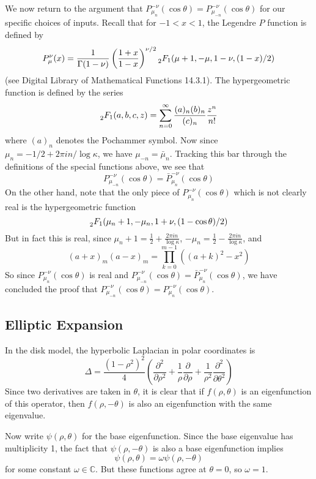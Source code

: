 \documentclass[]{article}
\begin{document}
We now return to the argument that $P_{\mu_{n}}^{-\nu}(\cos\theta) = P_{\mu_{-n}}^{-\nu}(\cos\theta)$ for our specific choices of inputs.
Recall that for $-1 < x < 1$, the Legendre $P$ function is defined by
$$
P_\mu^\nu(x) = 
\frac{1}{\Gamma(1 - \nu)}\left( \frac{1 + x}{1 - x} \right)^{\nu/2}\prescript{}{2}{F_1}(\mu + 1, -\mu, 1 - \nu, (1 - x)/2)
$$
(see Digital Library of Mathematical Functions 14.3.1).
The hypergeometric function is defined by the series
$$
\prescript{}{2}{F_1}(a, b, c, z) = \sum_{n=0}^{\infty}\frac{(a)_n(b)_n}{(c)_n}\frac{z^n}{n!}
$$
where $(a)_n$ denotes the Pochammer symbol.
Now since $\mu_n = -1/2 + 2\pi in/\log\kappa$, we have $\mu_{-n} = \bar{\mu}_n$.
Tracking this bar through the definitions of the special functions above, we see that
$$
P_{\mu_{-n}}^{-\nu}(\cos\theta) = \bar{P}_{\mu_{n}}^{-\nu}(\cos\theta)
$$
On the other hand, note that the only piece of $P_{\mu_{n}}^{-\nu}(\cos\theta)$ which is not clearly real is the hypergeometric function
$$
\prescript{}{2}{F_1}(\mu_n + 1, -\mu_n, 1 + \nu, (1 - \cos\theta)/2)
$$
But in fact this is real, since $\mu_n + 1 = \frac{1}{2} + \frac{2\pi in}{\log\kappa}$, $-\mu_n = \frac{1}{2} - \frac{2\pi in}{\log\kappa}$, and
$$
(a + x)_m(a - x)_m = \prod_{k=0}^{m-1}((a + k)^2 - x^2)
$$
So since $P_{\mu_{n}}^{-\nu}(\cos\theta)$ is real and $P_{\mu_{-n}}^{-\nu}(\cos\theta) = \bar{P}_{\mu_{n}}^{-\nu}(\cos\theta)$, we have concluded the proof that $P_{\mu_{-n}}^{-\nu}(\cos\theta) = P_{\mu_{n}}^{-\nu}(\cos\theta)$.

\subsection*{Elliptic Expansion}

In the disk model, the hyperbolic Laplacian in polar coordinates is
$$
\Delta = \frac{(1 - \rho^2)^2}{4}\left(\frac{\partial^2}{\partial\rho^2} +
\frac{1}{\rho}\frac{\partial}{\partial\rho} +
\frac{1}{\rho^2}\frac{\partial^2}{\partial\theta^2}\right)
$$
Since two derivatives are taken in $\theta$, it is clear that if $f(\rho, \theta)$ is an eigenfunction of this operator, then $f(\rho, -\theta)$ is also an eigenfunction with the same eigenvalue.

Now write $\psi(\rho, \theta)$ for the base eigenfunction.
Since the base eigenvalue has multiplicity 1, the fact that $\psi(\rho, -\theta)$ is also a base eigenfunction implies
$$
\psi(\rho, \theta) = \omega\psi(\rho, -\theta)
$$
for some constant $\omega \in \mathbb{C}$.
But these functions agree at $\theta = 0$, so $\omega = 1$.
\end{document}
